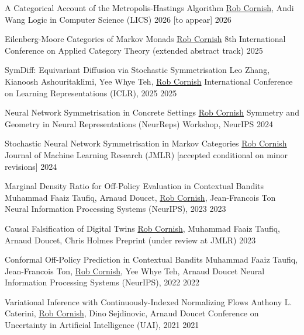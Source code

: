%

\publication
    {A Categorical Account of the Metropolis-Hastings Algorithm}
    {\underline{Rob Cornish}, Andi Wang}
    {Logic in Computer Science (LICS) 2026 [to appear]}
    {2026}

\publication
    {Eilenberg-Moore Categories of Markov Monads}
    {\underline{Rob Cornish}}
    {8th International Conference on Applied Category Theory (extended abstract track)}
    {2025}

\publication
    {SymDiff: Equivariant Diffusion via Stochastic Symmetrisation}
    {Leo Zhang, Kianoosh Ashouritaklimi, Yee Whye Teh, \underline{Rob Cornish}}
    {International Conference on Learning Representations (ICLR), 2025}
    {2025}

\publication
    {Neural Network Symmetrisation in Concrete Settings}
    {\underline{Rob Cornish}}
    {Symmetry and Geometry in Neural Representations (NeurReps) Workshop, NeurIPS}
    {2024}

\publication
    {Stochastic Neural Network Symmetrisation in Markov Categories}
    {\underline{Rob Cornish}}
    {Journal of Machine Learning Research (JMLR) [accepted conditional on minor revisions]}
    {2024}

\publication
    {Marginal Density Ratio for Off-Policy Evaluation in Contextual Bandits}
    {Muhammad Faaiz Taufiq, Arnaud Doucet, \underline{Rob Cornish}, Jean-Francois Ton}
    {Neural Information Processing Systems (NeurIPS), 2023}
    {2023}

\publication
    {Causal Falsification of Digital Twins}
    {\underline{Rob Cornish}, Muhammad Faaiz Taufiq, Arnaud Doucet, Chris Holmes}
    {Preprint (under review at JMLR)}
    {2023}

\publication
    {Conformal Off-Policy Prediction in Contextual Bandits}
    {Muhammad Faaiz Taufiq, Jean-Francois Ton, \underline{Rob Cornish}, Yee Whye Teh, Arnaud Doucet}
    {Neural Information Processing Systems (NeurIPS), 2022}
    {2022}

\publication
    {Variational Inference with Continuously-Indexed Normalizing Flows}
    {Anthony L. Caterini, \underline{Rob Cornish}, Dino Sejdinovic, Arnaud Doucet}
    {Conference on Uncertainty in Artificial Intelligence (UAI), 2021}
    {2021}

